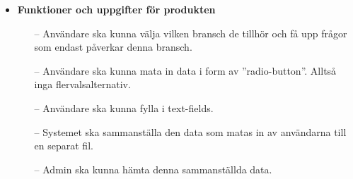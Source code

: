 \documentclass[12pt]{article}
\begin{document}
    \begin{itemize}
        \item \textbf{Funktioner och uppgifter för produkten}
        \begin{itemize}
            \item [--]Användare ska kunna välja vilken bransch de tillhör och få upp frågor som endast påverkar denna bransch.
        \end{itemize}
          
           \begin{itemize}
            \item [--]Användare ska kunna mata in data i form av ”radio-button”. Alltså inga flervalsalternativ.

        \end{itemize}
          
          \begin{itemize}
            \item [--]Användare ska kunna fylla i text-fields.

        \end{itemize}
          
          \begin{itemize}
            \item [--]Systemet ska sammanställa den data som matas in av användarna till en separat fil.

        \end{itemize}
          
          \begin{itemize}
            \item [--]Admin ska kunna hämta denna sammanställda data.


\end{itemize}
\end{itemize}
\end{document}

